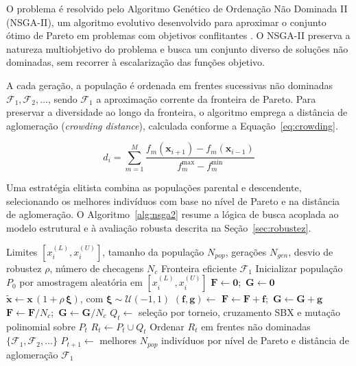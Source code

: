 O problema é resolvido pelo Algoritmo Genético de Ordenação Não Dominada II (NSGA-II), um algoritmo evolutivo desenvolvido para aproximar o conjunto ótimo de Pareto em problemas com objetivos conflitantes \parencite{DEB2009}. O NSGA-II preserva a natureza multiobjetivo do problema e busca um conjunto diverso de soluções não dominadas, sem recorrer à escalarização das funções objetivo.

A cada geração, a população é ordenada em frentes sucessivas não dominadas $\mathcal{F}_1, \mathcal{F}_2, \ldots$, sendo $\mathcal{F}_1$ a aproximação corrente da fronteira de Pareto. Para preservar a diversidade ao longo da fronteira, o algoritmo emprega a distância de aglomeração (\textit{crowding distance}), calculada conforme a Equação~\eqref{eq:crowding}.

\begin{equation}
d_i = \sum_{m=1}^{M} \frac{f_m(\mathbf{x}_{i+1}) - f_m(\mathbf{x}_{i-1})}{f_m^{\max} - f_m^{\min}}
\label{eq:crowding}
\end{equation}

Uma estratégia elitista combina as populações parental e descendente, selecionando os melhores indivíduos com base no nível de Pareto e na distância de aglomeração. O Algoritmo~\ref{alg:nsga2} resume a lógica de busca acoplada ao modelo estrutural e à avaliação robusta descrita na Seção~\ref{sec:robustez}.

\begin{algorithm}[!ht]
\caption{Otimização robusta multiobjetivo via NSGA-II acoplada ao modelo estrutural}\label{alg:nsga2}
\begin{algorithmic}[1]
\Require Limites $[x_i^{(L)}, x_i^{(U)}]$, tamanho da população $N_{pop}$, gerações $N_{gen}$, desvio de robustez $\rho$, número de checagens $N_c$
\Ensure Fronteira eficiente $\mathcal{F}_1$
\State Inicializar população $P_0$ por amostragem aleatória em $[x_i^{(L)}, x_i^{(U)}]$
        \State $\mathbf{F} \gets \mathbf{0}$;\ $\mathbf{G} \gets \mathbf{0}$
         
            \State $\tilde{\mathbf{x}} \gets \mathbf{x}\,(1 + \rho\,\boldsymbol{\xi})$, com $\boldsymbol{\xi} \sim \mathcal{U}(-1,1)$
            \State $(\mathbf{f}, \mathbf{g}) \gets$  
            \State $\mathbf{F} \gets \mathbf{F} + \mathbf{f}$;\ $\mathbf{G} \gets \mathbf{G} + \mathbf{g}$
        \EndFor
        \State $\mathbf{F} \gets \mathbf{F}/N_c$;\ $\mathbf{G} \gets \mathbf{G}/N_c$ 
    \EndFor
    \State $Q_t \gets$ seleção por torneio, cruzamento SBX e mutação polinomial sobre $P_t$
    \State $R_t \gets P_t \cup Q_t$
    \State Ordenar $R_t$ em frentes não dominadas $\{\mathcal{F}_1, \mathcal{F}_2, \ldots\}$
    \State $P_{t+1} \gets$ melhores $N_{pop}$ indivíduos por nível de Pareto e distância de aglomeração
\EndFor
\State \Return $\mathcal{F}_1$
\end{algorithmic}
\end{algorithm}

